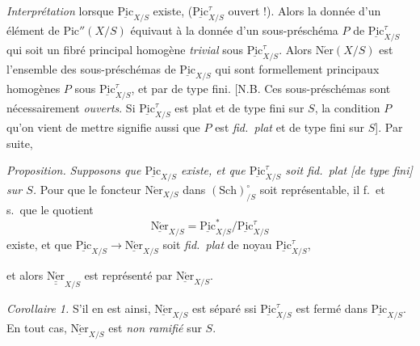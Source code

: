\documentclass[11pt,a4paper]{article}
\begin{document}
\emph{Interprétation} lorsque $\underline{\mathrm{Pic}}_{X/S}$ existe, ($\underline{\mathrm{Pic}}^{\tau}_{X/S}$ ouvert !). Alors la donnée d'un élément de $\mathrm{Pic}''(X/S)$ \struck{\ill{}} équivaut à la donnée d'un sous-préschéma  $P$ de $\underline{\mathrm{Pic}}^{\tau}_{X/S}$ qui soit un fibré principal homogène \emph{trivial} sous $\underline{\mathrm{Pic}}^{\tau}_{X/S}$. Alors $\mathrm{N\acute{e}r}(X/S)$ est l'ensemble des sous-préschémas \struck{$\longrightarrow$} de $\underline{\mathrm{Pic}}_{X/S}$ qui sont formellement principaux homogènes $P$  sous $\underline{\mathrm{Pic}}^{\tau}_{X/S}$, et \ill{} par \ill{}   de type fini. [N.B.  Ces sous-préschémas sont nécessairement \emph{ouverts}. Si $\underline{\mathrm{Pic}}^{\tau}_{X/S}$ est plat et de type fini sur $S$,  la condition \ill{} \ill{}  $P$ qu'on vient de mettre signifie aussi que $P$ est \emph{fid.\ plat} et de type fini sur $S$]. Par suite,


\emph{Proposition.} \emph{Supposons que $\underline{\mathrm{Pic}}_{X/S}$ existe, et que $\underline{\mathrm{Pic}}^{\tau}_{X/S}$ soit fid.\ plat [de type fini] sur $S$.} Pour que le foncteur $\mathrm{N\acute{e}r}_{X/S}$ \struck{\ill{}} dans $(\mathrm{Sch})^{\circ}_{/S}$ soit représentable, il f.\ et s.\ que le quotient
\[
\underline{\mathrm{N\acute{e}r}}_{X/S} = \underline{\mathrm{Pic}}^{*}_{X/S}/\underline{\mathrm{Pic}}^{\tau}_{X/S}
\]
existe, et  que $\underline{\mathrm{Pic}}_{X/S} \to \underline{\mathrm{N\acute{e}r}}_{X/S}$ soit \emph{fid.\ plat}   de noyau $\underline{\mathrm{Pic}}^{\tau}_{X/S}$,

et alors $\underline{\underline{\mathrm{N\acute{e}r}}}_{X/S}$ est représenté par $\underline{\mathrm{N\acute{e}r}}_{X/S}$.

\emph{Corollaire 1.} S'il en est ainsi, $\underline{\mathrm{N\acute{e}r}}_{X/S}$ est  séparé ssi $\underline{\mathrm{Pic}}^{\tau}_{X/S}$ est fermé dans $\underline{\mathrm{Pic}}_{X/S}$. En tout cas, $\underline{\mathrm{N\acute{e}r}}_{X/S}$ est \emph{non ramifié} sur $S$.
\end{document}
